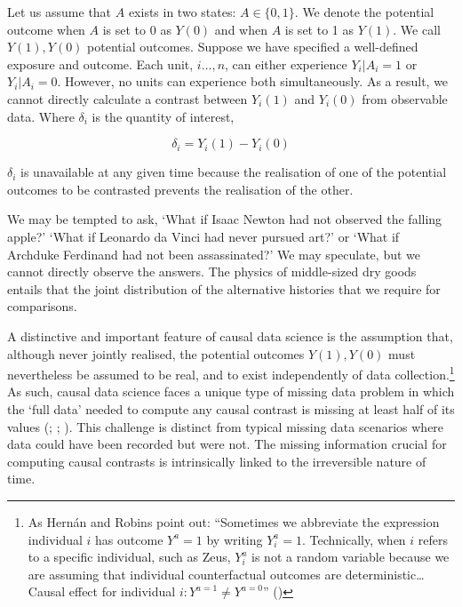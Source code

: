\documentclass[
  singlecolumn,
  9pt]{article}
\begin{document}
Let us assume that \(A\) exists in two states: \(A \in \{0,1\}\). We
denote the potential outcome when \(A\) is set to \(0\) as \(Y(0)\) and
when \(A\) is set to 1 as \(Y(1)\). We call \(Y(1), Y(0)\) potential
outcomes. Suppose we have specified a well-defined exposure and outcome.
Each unit, \(i \dots, n\), can either experience \(Y_i|A_i = 1\) or
\(Y_i|A_i = 0\). However, no units can experience both simultaneously.
As a result, we cannot directly calculate a contrast between \(Y_i(1)\)
and \(Y_i(0)\) from observable data. Where \(\delta_i\) is the quantity
of interest,

\[
\delta_i = Y_i(1) - Y_i(0)
\]

\(\delta_i\) is unavailable at any given time because the realisation of
one of the potential outcomes to be contrasted prevents the realisation
of the other.

We may be tempted to ask, `What if Isaac Newton had not observed the
falling apple?' `What if Leonardo da Vinci had never pursued art?' or
`What if Archduke Ferdinand had not been assassinated?' We may
speculate, but we cannot directly observe the answers. The physics of
middle-sized dry goods entails that the joint distribution of the
alternative histories that we require for comparisons.

A distinctive and important feature of causal data science is the
assumption that, although never jointly realised, the potential outcomes
\(Y(1),Y(0)\) must nevertheless be assumed to be real, and to exist
independently of data collection.\footnote{As Hernán and Robins point
  out: ``Sometimes we abbreviate the expression individual \(i\) has
  outcome \(Y^a = 1\) by writing \(Y^a_i = 1\). Technically, when \(i\)
  refers to a specific individual, such as Zeus, \(Y^a_i\) is not a
  random variable because we are assuming that individual counterfactual
  outcomes are deterministic\ldots{} Causal effect for individual
  \(i: Y^{a=1}\neq Y^{a=0}\)'' ()} As such, causal data science faces a unique type
of missing data problem in which the `full data' needed to compute any
causal contrast is missing at least half of its values
(;
;
). This
challenge is distinct from typical missing data scenarios where data
could have been recorded but were not. The missing information crucial
for computing causal contrasts is intrinsically linked to the
irreversible nature of time.
\end{document}
